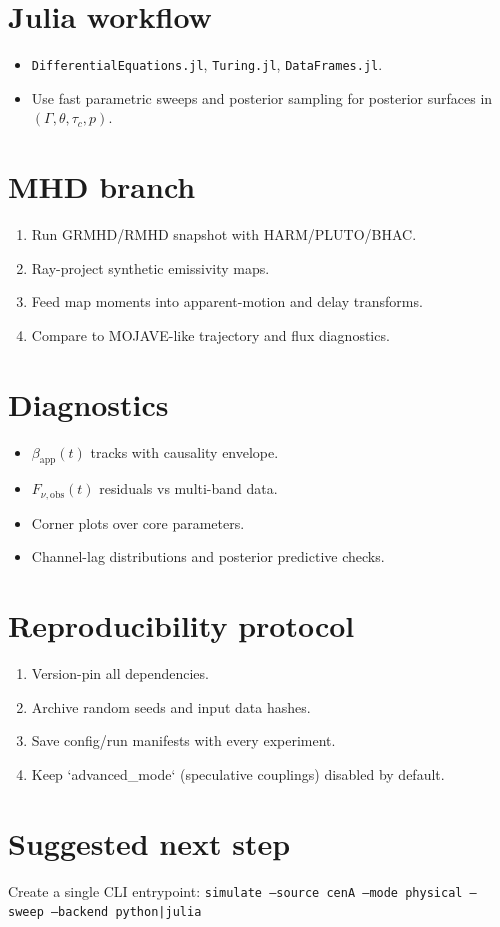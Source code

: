\documentclass[11pt]{article}
\begin{document}
\section{Julia workflow}
\begin{itemize}
\item \texttt{DifferentialEquations.jl}, \texttt{Turing.jl}, \texttt{DataFrames.jl}.
\item Use fast parametric sweeps and posterior sampling for posterior surfaces in \((\Gamma,\theta,\tau_c,p)\).
\end{itemize}

\section{MHD branch}
\begin{enumerate}
\item Run GRMHD/RMHD snapshot with HARM/PLUTO/BHAC.
\item Ray-project synthetic emissivity maps.
\item Feed map moments into apparent-motion and delay transforms.
\item Compare to MOJAVE-like trajectory and flux diagnostics.
\end{enumerate}

\section{Diagnostics}
\begin{itemize}
\item \(\beta_{\mathrm{app}}(t)\) tracks with causality envelope.
\item \(F_{\nu,\mathrm{obs}}(t)\) residuals vs multi-band data.
\item Corner plots over core parameters.
\item Channel-lag distributions and posterior predictive checks.
\end{itemize}

\section{Reproducibility protocol}
\begin{enumerate}
\item Version-pin all dependencies.
\item Archive random seeds and input data hashes.
\item Save config/run manifests with every experiment.
\item Keep `advanced_mode` (speculative couplings) disabled by default.
\end{enumerate}

\section{Suggested next step}
Create a single CLI entrypoint:
\texttt{simulate --source cenA --mode physical --sweep --backend python|julia}
\end{document}
